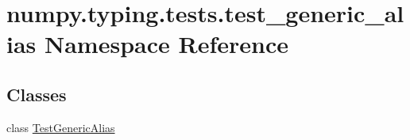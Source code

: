 \hypertarget{namespacenumpy_1_1typing_1_1tests_1_1test__generic__alias}{}\section{numpy.\+typing.\+tests.\+test\+\_\+generic\+\_\+alias Namespace Reference}
\label{namespacenumpy_1_1typing_1_1tests_1_1test__generic__alias}
\subsection*{Classes}
\begin{DoxyCompactItemize}
\item 
class \hyperlink{classnumpy_1_1typing_1_1tests_1_1test__generic__alias_1_1TestGenericAlias}{Test\+Generic\+Alias}
\end{DoxyCompactItemize}
